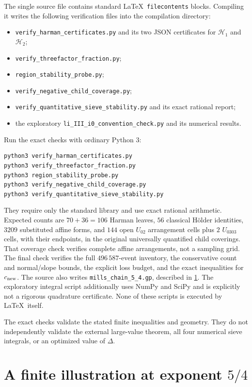 The single source file contains standard \LaTeX\ \texttt{filecontents}
blocks. Compiling it writes the following verification files into
the compilation directory:
\begin{itemize}[itemsep=2pt]
\item \texttt{verify\_harman\_certificates.py} and its two JSON
certificates for $\mathcal H_1$ and $\mathcal H_2$;
\item \texttt{verify\_threefactor\_fraction.py};
\item \texttt{region\_stability\_probe.py};
\item \texttt{verify\_negative\_child\_coverage.py};
\item \texttt{verify\_quantitative\_sieve\_stability.py} and its
exact rational report;
\item the exploratory \texttt{li\_III\_i0\_convention\_check.py}
and its numerical results.
\end{itemize}
Run the exact checks with ordinary Python 3:
\begin{verbatim}
python3 verify_harman_certificates.py
python3 verify_threefactor_fraction.py
python3 region_stability_probe.py
python3 verify_negative_child_coverage.py
python3 verify_quantitative_sieve_stability.py
\end{verbatim}
They require only the standard library and use exact rational
arithmetic. Expected counts are $70+36=106$ Harman leaves,
$56$ classical H\"older identities, $3209$ substituted affine
forms, and $144$ open $U_{02}$ arrangement cells plus $2$
$U_{0303}$ cells, with their endpoints, in the original universally
quantified child coverings.
That coverage check verifies complete affine arrangements, not a sampling grid.
The final check verifies the full $496\,587$-event inventory,
the conservative count and normal/slope bounds, the explicit loss
budget, and the exact inequalities for $c_{\rm new}$.
The source also writes \texttt{mills\_chain\_5\_4.gp}, described
in \cref{app:chain}. The exploratory integral script additionally uses NumPy and
SciPy and is explicitly not a rigorous quadrature certificate.
None of these scripts is executed by \LaTeX\ itself.

The exact checks validate the stated finite inequalities and geometry.
They do not independently validate the external large-value theorem,
all four numerical sieve integrals, or an optimized value of $\Delta$.


\section{A finite illustration at exponent \texorpdfstring{$5/4$}{5/4}}\label{app:chain}

